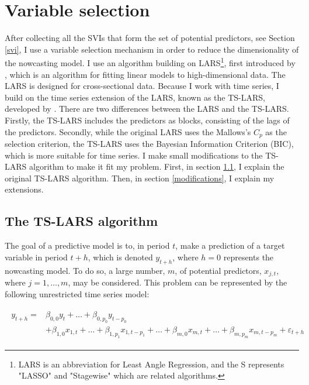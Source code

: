 \section{Variable selection}\label{variable_selection}

After collecting all the SVIs that form the set of potential predictors, see Section \ref{svi}, I use a variable selection mechanism in order to reduce the dimensionality of the nowcasting model. I use an algorithm building on LARS\footnote{LARS is an abbreviation for Least Angle Regression, and the S represents "LASSO" and "Stagewise" which are related algorithms.}, first introduced by \textcite{efron2004}, which is an algorithm for fitting linear models to high-dimensional data. The LARS is designed for cross-sectional data. Because I work with time series, I build on the time series extension of the LARS, known as the TS-LARS, developed by \textcite{gelper2008}. There are two differences between the LARS and the TS-LARS. Firstly, the TS-LARS includes the predictors as blocks, consisting of the lags of the predictors. Secondly, while the original LARS uses the Mallows's $C_p$ as the selection criterion, the TS-LARS uses the Bayesian Information Criterion (BIC), which is more suitable for time series. I make small modifications to the TS-LARS algorithm to make it fit my problem. First, in section \ref{tslars}, I explain the original TS-LARS algorithm. Then, in section \ref{modifications}, I explain my extensions.



\subsection{The TS-LARS algorithm}\label{tslars}

The goal of a predictive model is to, in period $t$, make a prediction of a target variable in period $t + h$, which is denoted $y_{t + h}$, where $h = 0$ represents the nowcasting model.
To do so, a large number, $m$, of potential predictors, $x_{j, t}$, where $j = 1, \ldots, m$, may be considered. This problem can be represented by the following unrestricted time series model:

\begin{align}
\begin{split}\label{ures_model}
	y_{t + h} ={}& \beta_{0, 0} y_t + \ldots + \beta_{0, p_0} y_{t - p_0} \\ & +\beta_{1, 0} x_{1, t} + \ldots + \beta_{1, p_1} x_{1, t - p_1} + \ldots + \beta_{m, 0} x_{m, t} + \ldots + \beta_{m, p_m} x_{m, t - p_m} + \varepsilon_{t + h}
\end{split}
\end{align}

